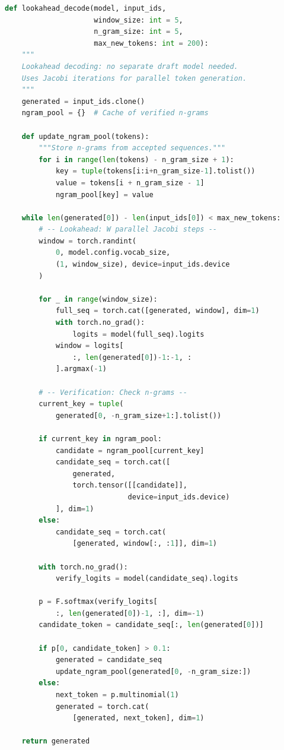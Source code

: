 \documentclass[11pt,a4paper]{article}
\begin{document}
\begin{lstlisting}[language=Python, caption={Lookahead Decoding: No Draft Model Needed}]
def lookahead_decode(model, input_ids, 
                     window_size: int = 5,
                     n_gram_size: int = 5,
                     max_new_tokens: int = 200):
    """
    Lookahead decoding: no separate draft model needed.
    Uses Jacobi iterations for parallel token generation.
    """
    generated = input_ids.clone()
    ngram_pool = {}  # Cache of verified n-grams
    
    def update_ngram_pool(tokens):
        """Store n-grams from accepted sequences."""
        for i in range(len(tokens) - n_gram_size + 1):
            key = tuple(tokens[i:i+n_gram_size-1].tolist())
            value = tokens[i + n_gram_size - 1]
            ngram_pool[key] = value
    
    while len(generated[0]) - len(input_ids[0]) < max_new_tokens:
        # -- Lookahead: W parallel Jacobi steps --
        window = torch.randint(
            0, model.config.vocab_size, 
            (1, window_size), device=input_ids.device
        )
        
        for _ in range(window_size):
            full_seq = torch.cat([generated, window], dim=1)
            with torch.no_grad():
                logits = model(full_seq).logits
            window = logits[
                :, len(generated[0])-1:-1, :
            ].argmax(-1)
        
        # -- Verification: Check n-grams --
        current_key = tuple(
            generated[0, -n_gram_size+1:].tolist())
        
        if current_key in ngram_pool:
            candidate = ngram_pool[current_key]
            candidate_seq = torch.cat([
                generated, 
                torch.tensor([[candidate]], 
                             device=input_ids.device)
            ], dim=1)
        else:
            candidate_seq = torch.cat(
                [generated, window[:, :1]], dim=1)
        
        with torch.no_grad():
            verify_logits = model(candidate_seq).logits
        
        p = F.softmax(verify_logits[
            :, len(generated[0])-1, :], dim=-1)
        candidate_token = candidate_seq[:, len(generated[0])]
        
        if p[0, candidate_token] > 0.1:
            generated = candidate_seq
            update_ngram_pool(generated[0, -n_gram_size:])
        else:
            next_token = p.multinomial(1)
            generated = torch.cat(
                [generated, next_token], dim=1)
    
    return generated
\end{lstlisting}
\end{document}
